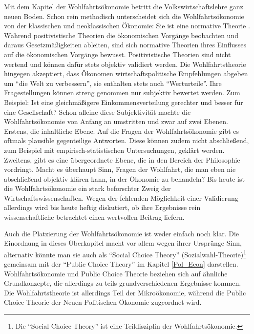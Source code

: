 Mit dem Kapitel der Wohlfahrtsökonomie betritt die Volkswirtschaftslehre ganz neuen Boden. Schon rein methodisch unterscheidet sich die Wohlfahrtsökonomie von der klassischen und neoklassischen Ökonomie: Sie ist eine normative Theorie \parencite[S. 77]{Scitovsky1941}. Während positivistische Theorien die ökonomischen Vorgänge beobachten und daraus Gesetzmäßigkeiten ableiten, sind sich normative Theorien ihres Einflusses auf die ökonomischen Vorgänge bewusst. Positivistische Theorien sind nicht wertend und können dafür stets objektiv validiert werden. Die Wohlfahrtstheorie hingegen akzeptiert, dass Ökonomen wirtschaftspolitische Empfehlungen abgeben um "`die Welt zu verbessern"', sie enthalten stets auch "`Werturteile"'. Ihre Fragestellungen können streng genommen nur subjektiv bewertet werden. Zum Beispiel: Ist eine gleichmäßigere Einkommensverteilung gerechter und besser für eine Gesellschaft?  Schon alleine diese Subjektivität machte die Wohlfahrtsökonomie von Anfang an umstritten und zwar auf zwei Ebenen. Erstens, die inhaltliche Ebene. Auf die Fragen der Wohlfahrtsökonomie gibt es oftmals plausible gegenteilige Antworten. Diese können zudem nicht abschließend, zum Beispiel mit empirisch-statistischen Untersuchungen, geklärt werden. Zweitens, gibt es eine übergeordnete Ebene, die in den Bereich der Philosophie vordringt. Macht es überhaupt Sinn, Fragen der Wohlfahrt, die man eben nie abschließend objektiv klären kann, in der Ökonomie zu behandeln? Bis heute ist die Wohlfahrtsökonomie ein stark beforschter Zweig der Wirtschaftswissenschaften. Wegen der fehlenden Möglichkeit einer Validierung allerdings wird bis heute heftig diskutiert, ob ihre Ergebnisse rein wissenschaftliche betrachtet einen wertvollen Beitrag liefern. 

Auch die Platzierung der Wohlfahrtsökonomie ist weder einfach noch klar. Die Einordnung in dieses Überkapitel macht vor allem wegen ihrer Ursprünge Sinn, alternativ könnte man sie auch als "`Social Choice Theory"' (Sozialwahl-Theorie)\footnote{Die "`Social Choice Theory"' ist eine Teildisziplin der Wohlfahrtsökonomie.} gemeinsam mit der "`Public Choice Theory"' im Kapitel \ref{Pol_Econ} darstellen. Wohlfahrtsökonomie und Public Choice Theorie beziehen sich auf ähnliche Grundkonzepte, die allerdings zu teils grundverschiedenen Ergebnisse kommen. Die Wohlfahrtstheorie ist allerdings Teil der Mikroökonomie, während die Public Choice Theorie der Neuen Politischen Ökonomie zugeordnet wird. 

